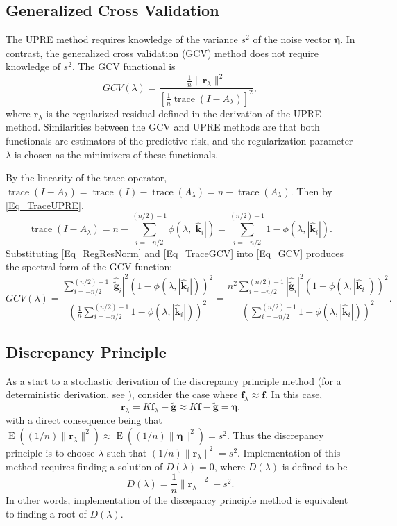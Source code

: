 \documentclass[12pt]{article}
\newcommand{\gnoise}{\widetilde{\mathbf{g}}}
\newcommand{\kdis}{\mathbf{k}}
\newcommand{\kmat}{K}	%
\newcommand{\fdis}{\mathbf{f}}
\newcommand{\trace}{\operatorname{trace}}	%
\newcommand{\regparam}{\lambda}
\newcommand{\freg}{\fdis_{\regparam}}	%
\newcommand{\filt}{\phi}
\newcommand{\SD}{s}	%
\newcommand{\noise}{\bm{\eta}}	%
\newcommand{\E}{\operatorname{E}}	%
\newcommand{\regres}{\mathbf{r}_{\regparam}}	%
\newcommand{\A}{A_{\regparam}}	%
\newcommand{\GCV}{GCV}	%
\newcommand{\D}{D}	%
\begin{document}
\subsection{Generalized Cross Validation}
The UPRE method requires knowledge of the variance $\SD^2$ of the noise vector $\noise$. In contrast, the generalized cross validation (GCV) method does not require knowledge of $\SD^2$. The GCV functional is
\begin{equation}
\label{Eq_GCV}
\GCV(\regparam) = \frac{\frac{1}{n}\|\regres\|^2}{\left[\frac{1}{n}\trace(I-\A)\right]^2},
\end{equation}
where $\regres$ is the regularized residual defined in the derivation of the UPRE method. Similarities between the GCV and UPRE methods are that both functionals are estimators of the predictive risk, and the regularization parameter $\regparam$ is chosen as the minimizers of these functionals. \par 
By the linearity of the trace operator, $\trace(I-\A) = \trace(I)-\trace(\A) = n - \trace(\A)$. Then by \eqref{Eq_TraceUPRE},
\begin{equation}
\trace(I-\A) = n - \sum_{i = -n/2}^{(n/2)-1} \filt(\regparam,|\widehat{\kdis}_i|) = \sum_{i = -n/2}^{(n/2)-1} 1 - \filt(\regparam,|\widehat{\kdis}_i|).
\label{Eq_TraceGCV}
\end{equation}
Substituting \eqref{Eq_RegResNorm} and \eqref{Eq_TraceGCV} into \eqref{Eq_GCV} produces the spectral form of the GCV function:
\begin{equation}
\GCV(\regparam) = \frac{\sum_{i = -n/2}^{(n/2)-1} |\widehat{\gnoise}_i|^2(1 - \filt(\regparam,|\widehat{\kdis}_i|))^2}{(\frac{1}{n}\sum_{i = -n/2}^{(n/2)-1} 1 - \filt(\regparam,|\widehat{\kdis}_i|))^2} = \frac{n^2\sum_{i = -n/2}^{(n/2)-1} |\widehat{\gnoise}_i|^2(1 - \filt(\regparam,|\widehat{\kdis}_i|))^2}{(\sum_{i = -n/2}^{(n/2)-1} 1 - \filt(\regparam,|\widehat{\kdis}_i|))^2}.
\label{Eq_SpectralGCV}
\end{equation}

\subsection{Discrepancy Principle}
As a start to a stochastic derivation of the discrepancy principle method (for a deterministic derivation, see \cite{Vogel:2002}), consider the case where $\freg \approx \fdis$. In this case,
\[\regres = \kmat\freg - \gnoise \approx \kmat\fdis - \gnoise = \noise.\]
with a direct consequence being that $\E((1/n)\|\regres\|^2) \approx \E((1/n)\|\noise\|^2) =\SD^2$. Thus the discrepancy principle is to choose $\regparam$ such that $(1/n)\|\regres\|^2 = \SD^2$.
Implementation of this method requires finding a solution of $\D(\regparam) = 0$, where $\D(\regparam)$ is defined to be
\begin{equation}
\label{Eq_DP}
\D(\regparam) = \frac{1}{n}\|\regres\|^2 - \SD^2.
\end{equation}
In other words, implementation of the discepancy principle method is equivalent to finding a root of $\D(\regparam)$.
\end{document}
